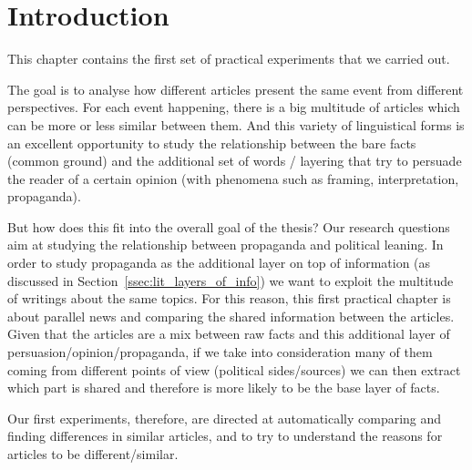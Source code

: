 \section{Introduction}


This chapter contains the first set of practical experiments that we carried out.

The goal is to analyse how different articles present the same event from different perspectives. For each event happening, there is a big multitude of articles which can be more or less similar between them.
And this variety of linguistical forms is an excellent opportunity to study the relationship between the bare facts (common ground) and the additional set of words / layering that try to persuade the reader of a certain opinion (with phenomena such as framing, interpretation, propaganda).

But how does this fit into the overall goal of the thesis? Our research questions aim at studying the relationship between propaganda and political leaning.
In order to study propaganda as the additional layer on top of information
(as discussed in Section~\ref{ssec:lit_layers_of_info})
we want to exploit the multitude of writings about the same topics. For this reason, this first practical chapter is about parallel news and comparing the shared information between the articles.
Given that the articles are a mix between raw facts and this additional layer of persuasion/opinion/propaganda, if we take into consideration many of them coming from different points of view (political sides/sources) we can then extract which part is shared and therefore is more likely to be the base layer of facts. 

Our first experiments, therefore, are directed at automatically comparing and finding differences in similar articles, and to try to understand the reasons for articles to be different/similar.

